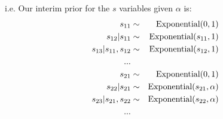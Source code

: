 \documentclass[a4paper, 11pt]{article}
\begin{document}
i.e. Our interim prior for the $s$ variables given $\alpha$ is:
\begin{eqnarray}
s_{11} &\sim& \textnormal{Exponential}(0, 1)\\
s_{12} | s_{11} &\sim& \textnormal{Exponential}(s_{11}, 1)\\
s_{13} | s_{11}, s_{12} &\sim& \textnormal{Exponential}(s_{12}, 1)\\
... &\\
s_{21} &\sim& \textnormal{Exponential}(0, 1)\\
s_{22} | s_{21} &\sim& \textnormal{Exponential}(s_{21}, \alpha)\\
s_{23} | s_{21}, s_{22} &\sim& \textnormal{Exponential}(s_{22}, \alpha)\\
... &
\end{eqnarray}



\end{document}
